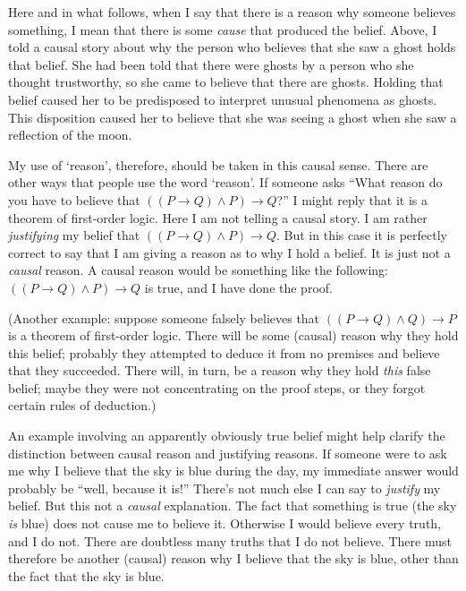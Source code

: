 \documentclass[11pt]{article}
\begin{document}
\begin{spacing}{1.5}
Here and in what follows, when I say that there is a reason why
someone believes something, I mean that there is some {\em cause} that
produced the belief.  Above, I told a causal story about why the
person who believes that she saw a ghost holds that belief.  She had
been told that there were ghosts by a person who she thought
trustworthy, so she came to believe that there are ghosts.  Holding
that belief caused her to be predisposed to interpret unusual
phenomena as ghosts.  This disposition caused her to believe that she
was seeing a ghost when she saw a reflection of the moon.

My use of `reason', therefore, should be taken in this causal sense.
There are other ways that people use the word `reason'.  If someone
asks ``What reason do you have to believe that $((P \rightarrow Q )
\wedge P) \rightarrow Q$?''  I might reply that it is a theorem of
first-order logic.  Here I am not telling a causal story.  I am rather
{\em justifying} my belief that $((P \rightarrow Q ) \wedge P)
\rightarrow Q$.  But in this case it is perfectly correct to say that
I am giving a reason as to why I hold a belief.  It is just not a {\em
  causal} reason.  A causal reason would be something like the
following: $((P \rightarrow Q ) \wedge P) \rightarrow Q$ is true, and
I have done the proof.

(Another example: suppose someone falsely believes that $((P
\rightarrow Q ) \wedge Q) \rightarrow P$ is a theorem of first-order
logic.  There will be some (causal) reason why they hold this belief;
probably they attempted to deduce it from no premises and believe that
they succeeded.  There will, in turn, be a reason why they hold {\em
  this} false belief; maybe they were not concentrating on the proof
steps, or they forgot certain rules of deduction.)

An example involving an apparently obviously true belief might help
clarify the distinction between causal reason and justifying reasons.
If someone were to ask me why I believe that the sky is blue during
the day, my immediate answer would probably be ``well, because it
is!''  There's not much else I can say to {\em justify} my belief.
But this not a {\em causal} explanation.  The fact that something is
true (the sky {\em is} blue) does not cause me to believe it.
Otherwise I would believe every truth, and I do not.  There are
doubtless many truths that I do not believe.  There must therefore be
another (causal) reason why I believe that the sky is blue, other than
the fact that the sky is blue.


\end{spacing}
\end{document}
